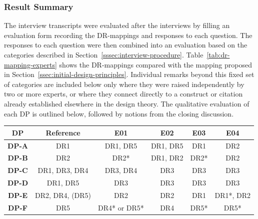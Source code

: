 \subsubsection{Result Summary} \label{sssec:interview-results}

The interview transcripts were evaluated after the interviews by filling an evaluation form recording the \ac{DR}-mappings and responses to each question. The responses to each question were then combined into an evaluation based on the categories described in Section~\ref{sssec:interview-procedure}. Table~\ref{tab:dr-mapping-experts} shows the DR-mappings compared with the mapping proposed in Section~\ref{ssec:initial-design-principles}. Individual remarks beyond this fixed set of categories are included below only where they were raised independently by two or more experts, or where they connect directly to a construct or citation already established elsewhere in the design theory. The qualitative evaluation of each \ac{DP} is outlined below, followed by notions from the closing discussion.

\begin{ctable}
    \centering
    \begin{tabular}{c c c c c c}
        \toprule
        \textbf{DP} & \textbf{Reference} & \textbf{E01} & \textbf{E02} & \textbf{E03} & \textbf{E04} \\
        \midrule
        \textbf{DP-A} & DR1 & DR1, \textcolor{paletteochre}{DR5} & DR1, \textcolor{paletteochre}{DR5} & DR1 & \textcolor{palettered}{DR2} \\
        \textbf{DP-B} & DR2 & DR2* & \textcolor{paletteochre}{DR1}, DR2 & DR2* & DR2 \\
        \textbf{DP-C} & DR1, DR3, DR4 & DR3, DR4 & DR3 & DR3 & DR3 \\
        \textbf{DP-D} & DR1, DR5 & \textcolor{palettered}{DR3} & \textcolor{palettered}{DR3} & \textcolor{palettered}{DR3} & \textcolor{palettered}{DR3} \\
        \textbf{DP-E} & DR2, DR4, (DR5) & DR2 & DR2 & \textcolor{palettered}{DR1} & \textcolor{paletteochre}{DR1}*, DR2 \\
        \textbf{DP-F} & DR5 & \textcolor{paletteochre}{DR4}* or DR5* & \textcolor{palettered}{DR4} & DR5* & DR5* \\
        \bottomrule
    \end{tabular}
    \caption[Expert \ac{DR}-mapping of the initial design principles]{Expert-stated \ac{DR}-mapping for each initial \ac{DP}, against the mapping shown in Section~\ref{ssec:initial-design-principles}. \textcolor{paletteochre}{Yellow} marks an added \ac{DR}, \textcolor{palettered}{red} marks full deviation, and an asterisk marks a mapping voiced only after clarification.}
    \label{tab:dr-mapping-experts}
\end{ctable}


